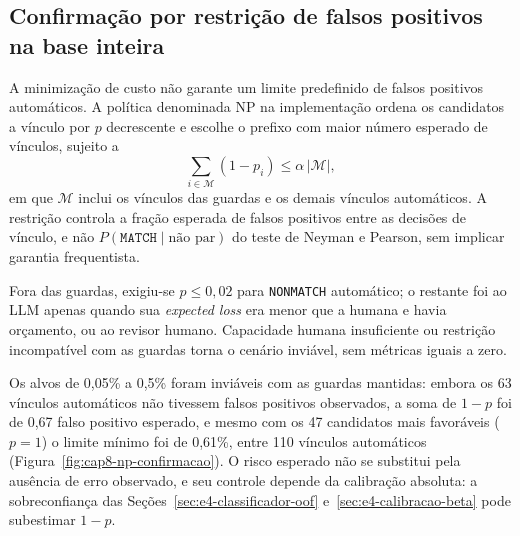 \subsection{Confirmação por restrição de falsos positivos na base inteira}
\label{sec:e4-np-confirmacao}

A minimização de custo não garante um limite predefinido de falsos positivos automáticos. A política denominada NP na implementação ordena os candidatos a vínculo por $p$ decrescente e escolhe o prefixo com maior número esperado de vínculos, sujeito a
\[
\sum_{i\in\mathcal{M}}(1-p_i)\leq\alpha\,|\mathcal{M}|,
\]
em que $\mathcal{M}$ inclui os vínculos das guardas e os demais vínculos automáticos. A restrição controla a fração esperada de falsos positivos entre as decisões de vínculo, e não $P(\texttt{MATCH}\mid\text{não par})$ do teste de Neyman e Pearson, sem implicar garantia frequentista.

Fora das guardas, exigiu-se $p\leq0{,}02$ para \texttt{NONMATCH} automático; o restante foi ao LLM apenas quando sua \textit{expected loss} era menor que a humana e havia orçamento, ou ao revisor humano. Capacidade humana insuficiente ou restrição incompatível com as guardas torna o cenário inviável, sem métricas iguais a zero.

Os alvos de 0,05\% a 0,5\% foram inviáveis com as guardas mantidas: embora os 63 vínculos automáticos não tivessem falsos positivos observados, a soma de $1-p$ foi de 0,67 falso positivo esperado, e mesmo com os 47 candidatos mais favoráveis ($p=1$) o limite mínimo foi de 0,61\%, entre 110 vínculos automáticos (Figura~\ref{fig:cap8-np-confirmacao}). O risco esperado não se substitui pela ausência de erro observado, e seu controle depende da calibração absoluta: a sobreconfiança das Seções~\ref{sec:e4-classificador-oof} e~\ref{sec:e4-calibracao-beta} pode subestimar $1-p$.

